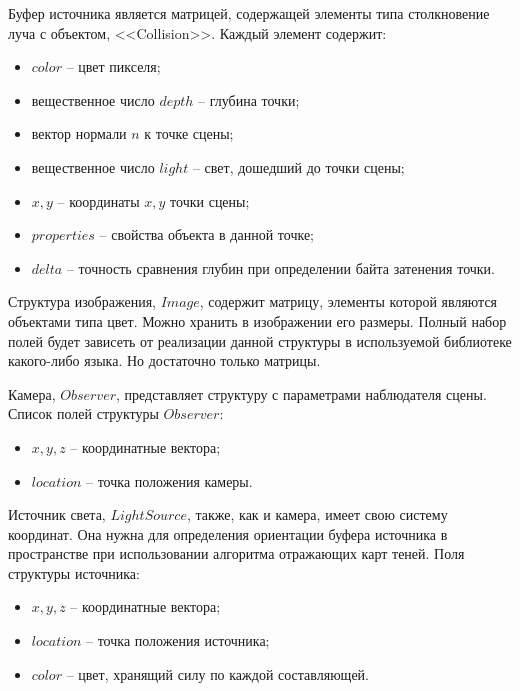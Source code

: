 {    Буфер источника является матрицей, содержащей элементы типа
    столкновение луча с объектом, <<Collision>>.
    Каждый элемент содержит:
    \begin{itemize}
        \item $color$ -- цвет пикселя;
        \item вещественное число $depth$ -- глубина точки;
        \item вектор нормали $n$ к точке сцены;
        \item вещественное число $light$ -- свет, дошедший до точки сцены;
        \item $x, y$ -- координаты $x, y$ точки сцены;
        \item $properties$ -- свойства объекта в данной точке;
        \item $delta$ -- точность сравнения глубин
        при определении байта затенения точки.
    \end{itemize}
    
    Структура изображения, $Image$, содержит матрицу, элементы
    которой являются объектами типа цвет.
    Можно хранить в изображении его размеры.
    Полный набор полей будет зависеть от реализации данной
    структуры в используемой библиотеке какого-либо языка.
    Но достаточно только матрицы.
    
    Камера, $Observer$, представляет структуру с параметрами наблюдателя сцены.
    Список полей структуры $Observer$:
    \begin{itemize}
        \item $x, y, z$ -- координатные вектора;
        \item $location$ -- точка положения камеры.
    \end{itemize}
    
    Источник света, $LightSource$, также, как и камера,
    имеет свою систему координат.
    Она нужна для определения ориентации буфера источника в пространстве
    при использовании алгоритма отражающих карт теней.
    Поля структуры источника:
    \begin{itemize}
        \item $x, y, z$ -- координатные вектора;
        \item $location$ -- точка положения источника;
        \item $color$ -- цвет, хранящий силу по каждой составляющей.
    \end{itemize}


}
